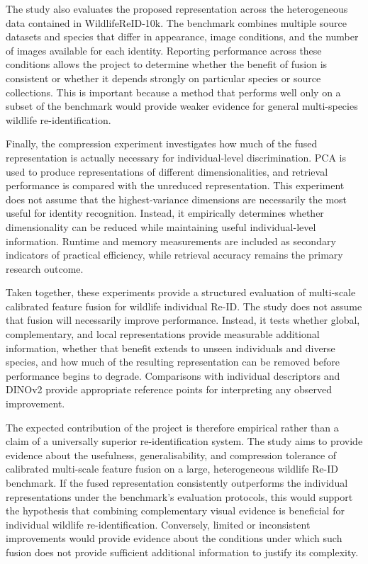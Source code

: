 \documentclass[runningheads]{llncs}
\begin{document}
The study also evaluates the proposed representation across the heterogeneous data contained in
WildlifeReID-10k. The benchmark combines multiple source datasets and species that differ in
appearance, image conditions, and the number of images available for each identity. Reporting
performance across these conditions allows the project to determine whether the benefit of fusion is
consistent or whether it depends strongly on particular species or source collections. This is
important because a method that performs well only on a subset of the benchmark would provide weaker
evidence for general multi-species wildlife re-identification.

Finally, the compression experiment investigates how much of the fused representation is actually
necessary for individual-level discrimination. PCA is used to produce representations of different
dimensionalities, and retrieval performance is compared with the unreduced representation. This
experiment does not assume that the highest-variance dimensions are necessarily the most useful for
identity recognition. Instead, it empirically determines whether dimensionality can be reduced while
maintaining useful individual-level information. Runtime and memory measurements are included as
secondary indicators of practical efficiency, while retrieval accuracy remains the primary research
outcome.

Taken together, these experiments provide a structured evaluation of multi-scale calibrated feature
fusion for wildlife individual Re-ID. The study does not assume that fusion will necessarily improve
performance. Instead, it tests whether global, complementary, and local representations provide
measurable additional information, whether that benefit extends to unseen individuals and diverse
species, and how much of the resulting representation can be removed before performance begins to
degrade. Comparisons with individual descriptors and DINOv2 provide appropriate reference points for
interpreting any observed improvement.

The expected contribution of the project is therefore empirical rather than a claim of a universally
superior re-identification system. The study aims to provide evidence about the usefulness,
generalisability, and compression tolerance of calibrated multi-scale feature fusion on a large,
heterogeneous wildlife Re-ID benchmark. If the fused representation consistently outperforms the
individual representations under the benchmark's evaluation protocols, this would support the
hypothesis that combining complementary visual evidence is beneficial for individual wildlife
re-identification. Conversely, limited or inconsistent improvements would provide evidence about the
conditions under which such fusion does not provide sufficient additional information to justify its
complexity.

%


\end{document}

